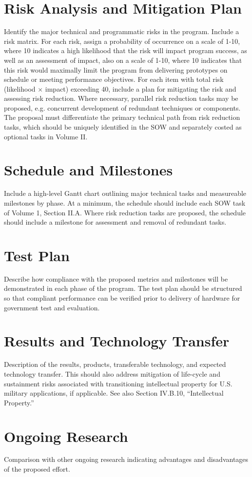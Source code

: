 \section{Risk Analysis and Mitigation Plan}
Identify the major technical and programmatic risks in the program. Include a risk matrix.
For each risk, assign a probability of occurrence on a scale of 1-10, where 10 indicates a high
likelihood that the risk will impact program success, as well as an assessment of impact, also
on a scale of 1-10, where 10 indicates that this risk would maximally limit the program from
delivering prototypes on schedule or meeting performance objectives. For each item with
total risk (likelihood × impact) exceeding 40, include a plan for mitigating the risk and
assessing risk reduction.
Where necessary, parallel risk reduction tasks may be proposed, e.g. concurrent development
of redundant techniques or components. The proposal must differentiate the primary
technical path from risk reduction tasks, which should be uniquely identified in the SOW and
separately costed as optional tasks in Volume II.
\section{Schedule and Milestones}
Include a high-level Gantt chart outlining major technical tasks and measureable milestones
by phase. At a minimum, the schedule should include each SOW task of Volume 1, Section
II.A. Where risk reduction tasks are proposed, the schedule should include a milestone for
assessment and removal of redundant tasks.
\section{Test Plan}
Describe how compliance with the proposed metrics and milestones will be demonstrated in
each phase of the program. The test plan should be structured so that compliant performance
can be verified prior to delivery of hardware for government test and evaluation.
\section{Results and Technology Transfer}
Description of the results, products, transferable technology, and expected technology
transfer. This should also address mitigation of life-cycle and sustainment risks associated
with transitioning intellectual property for U.S. military applications, if applicable. See also
Section IV.B.10, “Intellectual Property.”
\section{Ongoing Research}
Comparison with other ongoing research indicating advantages and disadvantages of the
proposed effort.
